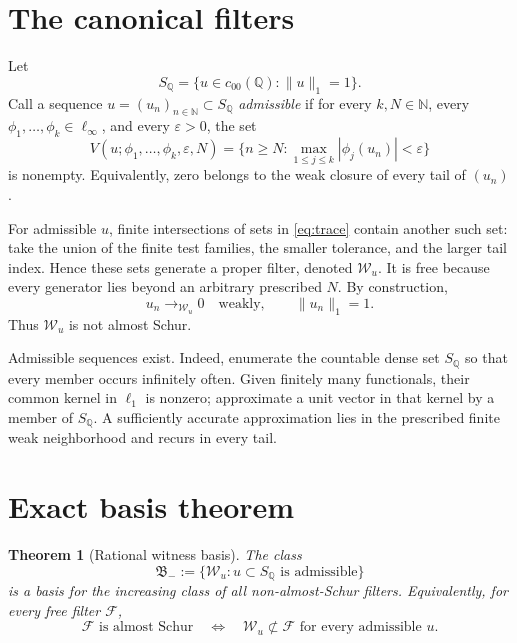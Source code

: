 \documentclass[10pt]{article}
\newtheorem{theorem}{Theorem}
\newcommand{\N}{\mathbb N}
\newcommand{\Q}{\mathbb Q}
\newcommand{\F}{\mathcal F}
\newcommand{\W}{\mathcal W}
\newcommand{\ellone}{\ell_1}
\begin{document}
\section*{The canonical filters}

Let
\[
 S_{\Q}=\{u\in c_{00}(\Q):\|u\|_1=1\}.
\]
Call a sequence $u=(u_n)_{n\in\N}\subset S_{\Q}$ \emph{admissible} if for
every $k,N\in\N$, every $\phi_1,\dots,\phi_k\in\ell_\infty$, and every
$\varepsilon>0$, the set
\begin{equation}\label{eq:trace}
 V(u;\phi_1,\dots,\phi_k,\varepsilon,N)
 =\{n\ge N:\max_{1\le j\le k}|\phi_j(u_n)|<\varepsilon\}
\end{equation}
is nonempty.  Equivalently, zero belongs to the weak closure of every tail of
$(u_n)$.

For admissible $u$, finite intersections of sets in \eqref{eq:trace} contain
another such set: take the union of the finite test families, the smaller
tolerance, and the larger tail index.  Hence these sets generate a proper
filter, denoted $\W_u$.  It is free because every generator lies beyond an
arbitrary prescribed $N$.  By construction,
\[
 u_n\longrightarrow_{\W_u}0\quad\text{weakly},
 \qquad \|u_n\|_1=1.
\]
Thus $\W_u$ is not almost Schur.

Admissible sequences exist.  Indeed, enumerate the countable dense set
$S_{\Q}$ so that every member occurs infinitely often.  Given finitely many
functionals, their common kernel in $\ellone$ is nonzero; approximate a unit
vector in that kernel by a member of $S_{\Q}$.  A sufficiently accurate
approximation lies in the prescribed finite weak neighborhood and recurs in
every tail.

\section*{Exact basis theorem}

\begin{theorem}[Rational witness basis]\label{thm:basis}
The class
\[
 \mathfrak B_-:=\{\W_u:u\subset S_{\Q}\text{ is admissible}\}
\]
is a basis for the increasing class of all non-almost-Schur filters.
Equivalently, for every free filter $\F$,
\begin{equation}\label{eq:criterion}
 \F\text{ is almost Schur}
 \quad\Longleftrightarrow\quad
 \W_u\not\subset\F\text{ for every admissible }u.
\end{equation}
\end{theorem}
\end{document}

